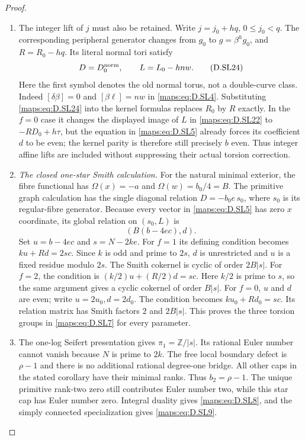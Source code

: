 \begin{proof}
\begin{enumerate}[label=\arabic*.,leftmargin=*]
\item The integer lift of $j$ must also be retained.
Write $j=j_0+hq$, $0\le j_0<q$. The corresponding
peripheral generator changes from $g_0$ to
$g=\beta^h g_0$, and $R=R_0-hq$.
Its literal normal tori satisfy
\[
                    D=D_0^{\rm norm},\qquad
                    L=L_0-hn w.                           \tag{D.SL24}\label{maps:eq:D.SL24}
\]
Here the first symbol denotes the old normal
torus, not a double-curve class. Indeed
$[\delta\beta]=0$ and $[\beta\ell]=nw$
in \eqref{maps:eq:D.SL4}. Substituting \eqref{maps:eq:D.SL24} into
the kernel formulas replaces $R_0$ by
$R$ exactly. In the $f=0$ case it changes
the displayed image of $L$ in \eqref{maps:eq:D.SL22} to
$-RD_0+h\tau$, but the equation in
\eqref{maps:eq:D.SL5} already forces its coefficient
$d$ to be even; the kernel parity is
therefore still precisely $b$ even.
Thus integer affine lifts are included
without suppressing their actual torsion
correction.

\item \emph{The closed one-star Smith calculation.}
For the natural minimal exterior, the
fibre functional has
$\Omega(x)=-a$ and $\Omega(w)=b_0/4=B$.
The primitive graph calculation has the
single diagonal relation $D=-b_0e\,s_0$,
where $s_0$ is its regular-fibre generator.
Because every vector in \eqref{maps:eq:D.SL5} has zero
$x$ coordinate, its global relation on
$(s_0,L)$ is
\[
                         (B(b-4ec),d).                   \tag{D.SL23}\label{maps:eq:D.SL23}
\]
Set $u=b-4ec$ and $s=N-2ke$.
For $f=1$ its defining condition becomes
$ku+Rd=2sc$. Since $k$ is odd and prime
to $2s$, $d$ is unrestricted and
$u$ is a fixed residue modulo $2s$.
The Smith cokernel is cyclic of order
$2B|s|$.
For $f=2$, the condition is
$(k/2)u+(R/2)d=sc$.
Here $k/2$ is prime to $s$, so the same
argument gives a cyclic cokernel of
order $B|s|$.
For $f=0$, $u$ and $d$ are even; write
$u=2u_0,d=2d_0$. The condition becomes
$ku_0+Rd_0=sc$. Its relation matrix has
Smith factors $2$ and $2B|s|$.
This proves the three torsion groups
in \eqref{maps:eq:D.SL7} for every parameter.

\item The one-log Seifert presentation gives
$\pi_1=\mathbb Z/|s|$. Its rational
Euler number cannot vanish because
$N$ is prime to $2k$. The free local
boundary defect is $\rho-1$ and there
is no additional rational degree-one
bridge. All other caps in the stated
corollary have their minimal ranks.
Thus $b_2=\rho-1$. The unique primitive
rank-two zero still contributes Euler
number two, while this star cap has
Euler number zero. Integral duality
gives \eqref{maps:eq:D.SL8}, and the simply connected
specialization gives \eqref{maps:eq:D.SL9}.
\end{enumerate}
\end{proof}

